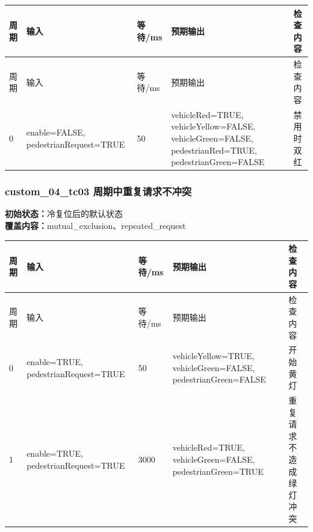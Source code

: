 \begin{longtable}{L{1.0cm}L{4.7cm}L{1.4cm}L{4.0cm}L{2.1cm}}

\toprule

周期 & 输入 & 等待/ms & 预期输出 & 检查内容\\

\midrule

\endfirsthead

\toprule

周期 & 输入 & 等待/ms & 预期输出 & 检查内容\\

\midrule

\endhead

0 & enable=FALSE, pedestrianRequest=TRUE & 50 & vehicleRed=TRUE, vehicleYellow=FALSE, vehicleGreen=FALSE, pedestrianRed=TRUE, pedestrianGreen=FALSE & 禁用时双红\\

\bottomrule

\end{longtable}

\subsubsection{{\ttfamily custom\_04\_tc03} 周期中重复请求不冲突}

\noindent\textbf{初始状态：}冷复位后的默认状态\\

\textbf{覆盖内容：}mutual\_exclusion、repeated\_request

\begin{longtable}{L{1.0cm}L{4.7cm}L{1.4cm}L{4.0cm}L{2.1cm}}

\toprule

周期 & 输入 & 等待/ms & 预期输出 & 检查内容\\

\midrule

\endfirsthead

\toprule

周期 & 输入 & 等待/ms & 预期输出 & 检查内容\\

\midrule

\endhead

0 & enable=TRUE, pedestrianRequest=TRUE & 50 & vehicleYellow=TRUE, vehicleGreen=FALSE, pedestrianGreen=FALSE & 开始黄灯\\

1 & enable=TRUE, pedestrianRequest=TRUE & 3000 & vehicleRed=TRUE, vehicleGreen=FALSE, pedestrianGreen=TRUE & 重复请求不造成绿灯冲突\\

\bottomrule

\end{longtable}

